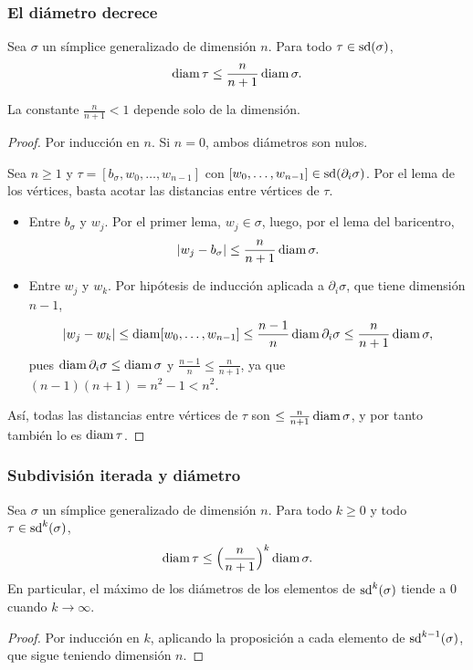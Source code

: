 \begin{frame}[allowframebreaks]
  \frametitle{El diámetro decrece}

  \begin{proposition}
    Sea $\sigma$ un símplice generalizado de dimensión $n$. Para todo
    $\tau\in\operatorname{sd}(\sigma)$,
    \[
      \operatorname{diam}\tau\leq\frac{n}{n+1}\operatorname{diam}\sigma.
    \]
  \end{proposition}

  La constante $\frac{n}{n+1}<1$ depende \alert{solo de la dimensión}.

  \begin{proof}
    Por inducción en $n$. Si $n=0$, ambos diámetros son nulos.

    \medskip

    Sea $n\geq1$ y $\tau=[b_\sigma,w_0,\ldots,w_{n-1}]$ con
    $[w_0,\ldots,w_{n-1}]\in\operatorname{sd}(\partial_i\sigma)$. Por el lema de los vértices,
    basta acotar las distancias entre vértices de $\tau$.

    \framebreak

    \begin{itemize}
      \item \alert{Entre $b_\sigma$ y $w_j$.} Por el primer lema,
        $w_j\in\sigma$, luego, por el lema del baricentro,
        \[
          |w_j-b_\sigma|\leq\frac{n}{n+1}\operatorname{diam}\sigma.
        \]
      \item \alert{Entre $w_j$ y $w_k$.} Por hipótesis de inducción
        aplicada a $\partial_i\sigma$, que tiene dimensión $n-1$,
        \[
          |w_j-w_k|\leq\operatorname{diam}[w_0,\ldots,w_{n-1}]
          \leq\frac{n-1}{n}\operatorname{diam} \partial_i\sigma
          \leq\frac{n}{n+1}\operatorname{diam}\sigma,
        \]
        pues $\operatorname{diam} \partial_i\sigma\leq\operatorname{diam}\sigma$ y
        $\frac{n-1}{n}\leq\frac{n}{n+1}$, ya que $(n-1)(n+1)=n^2-1<n^2$.
    \end{itemize}

    \medskip

    Así, todas las distancias entre vértices de $\tau$ son
    $\leq\frac{n}{n+1}\operatorname{diam}\sigma$, y por tanto también lo es
    $\operatorname{diam}\tau$.
  \end{proof}
\end{frame}

\begin{frame}
  \frametitle{Subdivisión iterada y diámetro}

  \begin{corollary}
    Sea $\sigma$ un símplice generalizado de dimensión $n$. Para todo
    $k\geq0$ y todo $\tau\in\operatorname{sd}^k(\sigma)$,
    \[
      \operatorname{diam}\tau\leq\Bigl(\frac{n}{n+1}\Bigr)^k\operatorname{diam}\sigma.
    \]
    En particular, el máximo de los diámetros de los elementos de
    $\operatorname{sd}^k(\sigma)$ tiende a $0$ cuando $k\to\infty$.
  \end{corollary}

  \begin{proof}
    Por inducción en $k$, aplicando la proposición a cada elemento de
    $\operatorname{sd}^{k-1}(\sigma)$, que sigue teniendo dimensión $n$.
  \end{proof}
  
\end{frame}
